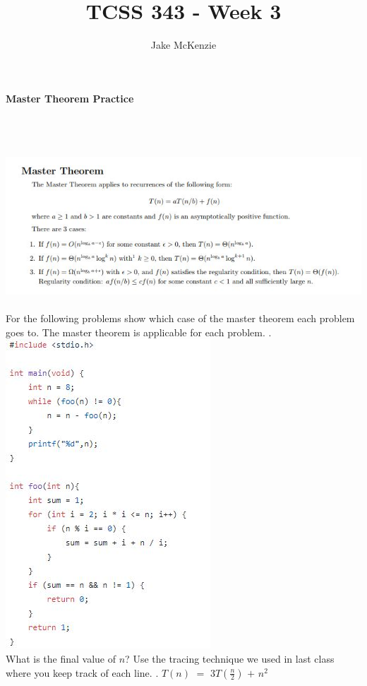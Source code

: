\documentclass[12pt]{article}
\begin{document}
\title{TCSS 343 - Week 3}
\author{Jake McKenzie}
\maketitle
\noindent\centerline{\textbf{Master Theorem Practice}}\\\\
\\\includegraphics[width=\linewidth]{mt.jpg}\\\\
For the following problems show which case of the master theorem 
each problem goes to. The master theorem is applicable for each 
problem.
\newpage
{}. \\\includegraphics[scale = 1]{debug3_2.jpg}\\
What is the final value of $n$? Use the tracing 
technique we used in last class where you keep 
track of each line.
\newpage
{}. $T(n)$ $=$ $3T(\frac{n}{2})$ $+$ $n^2$\\\\\\\\\\
\end{document}
